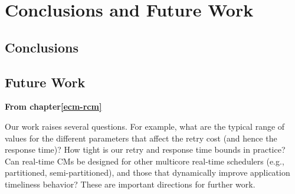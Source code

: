 \chapter{\label{ch:conclusion}Conclusions and Future Work}

\section{Conclusions}\label{sec:conclusions}

\section{Future Work}\label{sec:future_work}
%
\textbf{From chapter\ref{ecm-rcm}}

Our work raises several questions.  
For example, what are the typical range of values for the different parameters that affect the retry cost (and hence the response time)? How tight is our retry and response time bounds in practice? Can real-time CMs be designed for other multicore real-time schedulers (e.g., partitioned, semi-partitioned), and those that dynamically improve application timeliness behavior? These are important directions for further work. 